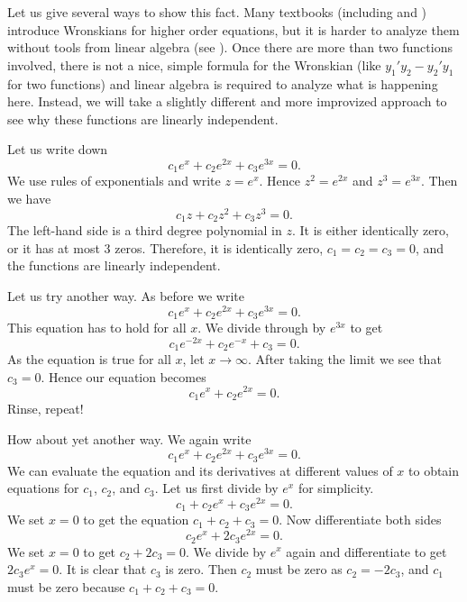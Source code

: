 \documentclass{ximera}
\begin{document}
\begin{exampleSol}
    Let us give several ways to show this fact. Many textbooks (including \cite{EP} and \cite{F}) introduce Wronskians for higher order equations, but it is harder to analyze them without tools from linear algebra (see ). Once there are more than two functions involved, there is not a nice, simple formula for the Wronskian (like $y_1'y_2 - y_2'y_1$ for two functions) and linear algebra is required to analyze what is happening here. Instead, we will take a slightly different and more improvized approach to see why these functions are linearly independent.
    
    Let us write down
    \begin{equation*}
        c_1 e^x + c_2 e^{2x} + c_3 e^{3x} = 0.
    \end{equation*}
    We use rules of exponentials and write $z = e^x$.  Hence $z^2 = e^{2x}$ and $z^3 = e^{3x}$.  Then we have
    \begin{equation*}
        c_1 z + c_2 z^2 + c_3 z^3 = 0.
    \end{equation*}
    The left-hand side is a third degree polynomial in $z$. It is either identically zero, or it has at most 3 zeros.  Therefore, it is identically zero, $c_1 = c_2 = c_3 = 0$, and the functions are linearly independent.
    
    Let us try another way.  As before we write
    \begin{equation*}
        c_1 e^x + c_2 e^{2x} + c_3 e^{3x} = 0.
    \end{equation*}
    This equation has to hold for all $x$.  We divide through by $e^{3x}$ to get
    \begin{equation*}
        c_1 e^{-2x} + c_2 e^{-x} + c_3 = 0.
    \end{equation*}
    As the equation is true for all $x$, let $x \to \infty$.  After taking the limit we see that $c_3 = 0$.  Hence our equation becomes
    \begin{equation*}
        c_1 e^x + c_2 e^{2x} = 0.
    \end{equation*}
    Rinse, repeat!
    
    How about yet another way.  We again write
    \begin{equation*}
        c_1 e^x + c_2 e^{2x} + c_3 e^{3x} = 0.
    \end{equation*}
    We can evaluate the equation and its derivatives at different values of $x$ to obtain equations for $c_1$, $c_2$, and $c_3$. Let us first divide by $e^{x}$ for simplicity.
    \begin{equation*}
        c_1 + c_2 e^{x} + c_3 e^{2x} = 0.
    \end{equation*}
    We set $x=0$ to get the equation $c_1 + c_2 + c_3 = 0$.  Now differentiate both sides
    \begin{equation*}
        c_2 e^{x} + 2 c_3 e^{2x} = 0 .
    \end{equation*}
    We set $x=0$ to get $c_2 + 2c_3 = 0$.  We divide by $e^x$ again and differentiate to get $2 c_3 e^{x} = 0$.  It is clear that $c_3$ is zero.  Then $c_2$ must be zero as $c_2 = -2c_3$, and $c_1$ must be zero because $c_1 + c_2 + c_3 = 0$.
    

\end{exampleSol}
\end{document}
